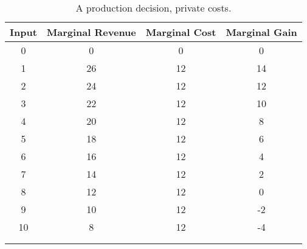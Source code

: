 \begin{longtable}{cccc}
\hline
\textbf{Input} & \textbf{Marginal Revenue} & \textbf{Marginal Cost} & \textbf{Marginal Gain}\\ 
\hline
0 & 0 & 0 & 0 \\
1 & 26 & 12 & 14 \\
2 & 24 & 12 & 12 \\
3 & 22 & 12& 10 \\
4 & 20 & 12 & 8 \\
5 & 18 & 12 & 6\\
6 & 16 & 12 & 4 \\
7 & 14 & 12 & 2 \\
8 & 12 & 12 & 0 \\
9 & 10 & 12 & -2 \\
10 & 8 & 12 & -4 \\
\hline \\

\caption{A production decision, private costs.}  \label{tab:production_decision_private}\\
\end{longtable}
